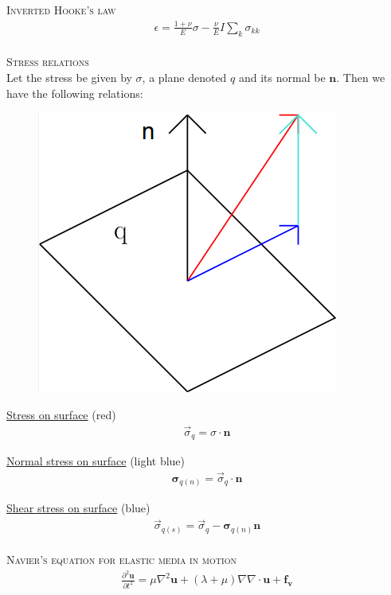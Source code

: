 \documentclass[11pt,a4paper,english]{article}
\begin{document}
{\scshape Inverted Hooke's law} \\
\begin{align*}
\epsilon = \frac{1+\nu}{E}\sigma - \frac{\nu}{E}I \sum_k \sigma_{kk}
\end{align*}
\\[2ex]

{\scshape Stress relations} \\

\noindent
Let the stress be given by $\sigma$, a plane denoted $q$ and its normal be $\mathbf{n}$. Then we have the following relations:
\begin{figure}[h!]
\centering
\includegraphics[scale=0.3]{figures/stressplane.png}
\end{figure}

\underline{Stress on surface} (red)
\begin{align*}
\vec{\sigma}_q =\sigma \cdot \mathbf{n}
\end{align*}

\underline{Normal stress on surface} (light blue)
\begin{align*}
\mathbf{\sigma}_{q(n)} =\vec{\sigma}_q \cdot \mathbf{n}
\end{align*}

\underline{Shear stress on surface} (blue)
\begin{align*}
\vec{\sigma}_{q(s)} =\vec{\sigma}_q -\mathbf{\sigma}_{q(n)} \mathbf{n}
\end{align*}
\\[2ex]

{\scshape Navier's equation for elastic media in motion} \\
\begin{align*}
\frac{\partial^2 \mathbf{u}}{\partial t^2} = \mu \nabla^2 \mathbf{u} + (\lambda + \mu) \nabla \nabla \cdot \mathbf{u} + \mathbf{f_v}
\end{align*}
\end{document}
